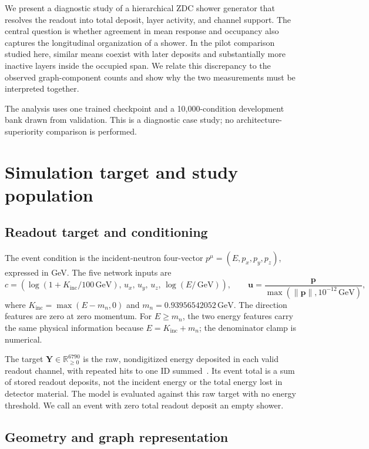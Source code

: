 \documentclass[11pt]{article}
\newcommand{\GeV}{\,\mathrm{GeV}}
\newcommand{\Kinc}{K_{\mathrm{inc}}}
\newcommand{\Y}{\mathbf{Y}}
\begin{document}
We present a diagnostic study of a hierarchical ZDC shower generator that resolves the readout into total deposit, layer activity, and channel support. The central question is whether agreement in mean response and occupancy also captures the longitudinal organization of a shower. In the pilot comparison studied here, similar means coexist with later deposits and substantially more inactive layers inside the occupied span. We relate this discrepancy to the observed graph-component counts and show why the two measurements must be interpreted together.

The analysis uses one trained checkpoint and a 10,000-condition development bank drawn from validation. This is a diagnostic case study; no architecture-superiority comparison is performed.

\section{Simulation target and study population}
\label{sec:data}

\subsection{Readout target and conditioning}

The event condition is the incident-neutron four-vector $p^\mu=(E,p_x,p_y,p_z)$, expressed in GeV. The five network inputs are
\begin{equation}
 c=\left(\log(1+\Kinc/100\GeV),\,u_x,\,u_y,\,u_z,\,\log(E/\GeV)\right),
 \qquad \mathbf u=\frac{\mathbf p}{\max(\lVert\mathbf p\rVert,10^{-12}\GeV)},
 \label{eq:condition}
\end{equation}
where $\Kinc=\max(E-m_n,0)$ and $m_n=0.93956542052\GeV$. The direction features are zero at zero momentum. For $E\geq m_n$, the two energy features carry the same physical information because $E=\Kinc+m_n$; the denominator clamp is numerical.

The target $\Y\in\mathbb R_{\geq0}^{6790}$ is the raw, nondigitized energy deposited in each valid readout channel, with repeated hits to one ID summed~\cite{geant4}. Its event total is a sum of stored readout deposits, not the incident energy or the total energy lost in detector material. The model is evaluated against this raw target with no energy threshold. We call an event with zero total readout deposit an empty shower.

\subsection{Geometry and graph representation}
\end{document}

